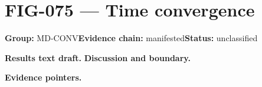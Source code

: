 \clearpage
\section{FIG-075 --- Time convergence}
\label{figpage:fig-075}
\textbf{Group:} MD-CONV\quad \textbf{Evidence chain:} manifested\quad \textbf{Status:} unclassified

\textbf{Results text draft.} 
\textbf{Discussion and boundary.} 


\textbf{Evidence pointers.}



\vfill
